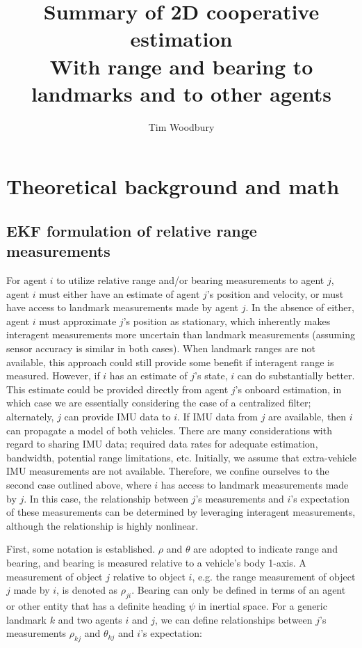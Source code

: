 \documentclass{aiaa-tc}
\title{Summary of 2D cooperative estimation \\ \large{With range and bearing to landmarks and to other agents}}
\author{Tim Woodbury}
\begin{document}
\maketitle

\section{Theoretical background and math}

\subsection{ EKF formulation of relative range measurements }

For agent $i$ to utilize relative range and/or bearing measurements to agent $j$, agent $i$ must either have an estimate of agent $j$'s position and velocity, or must have access to landmark measurements made by agent $j$. In the absence of either, agent $i$ must approximate $j$'s position as stationary, which inherently makes interagent measurements more uncertain than landmark measurements (assuming sensor accuracy is similar in both cases). When landmark ranges are not available, this approach could still provide some benefit if interagent range is measured. However, if $i$ has an estimate of $j$'s state, $i$ can do substantially better. This estimate could be provided directly from agent $j$'s onboard estimation, in which case we are essentially considering the case of a centralized filter; alternately, $j$ can provide IMU data to $i$. If IMU data from $j$ are available, then $i$ can propagate a model of both vehicles. There are many considerations with regard to sharing IMU data; required data rates for adequate estimation, bandwidth, potential range limitations, etc. Initially, we assume that extra-vehicle IMU measurements are not available. Therefore, we confine ourselves to the second case outlined above, where $i$ has access to landmark measurements made by $j$. In this case, the relationship between $j$'s measurements and $i$'s expectation of these measurements can be determined by leveraging interagent measurements, although the relationship is highly nonlinear.

First, some notation is established. $\rho$ and $\theta$ are adopted to indicate range and bearing, and bearing is measured relative to a vehicle's body 1-axis. A measurement of object $j$ relative to object $i$, e.g. the range measurement of object $j$ made by $i$, is denoted as $\rho_{ji}$. Bearing can only be defined in terms of an agent or other entity that has a definite heading $\psi$ in inertial space. For a generic landmark $k$ and two agents $i$ and $j$, we can define relationships between $j$'s measurements $\rho_{kj}$ and $\theta_{kj}$ and $i$'s expectation:
\end{document}

